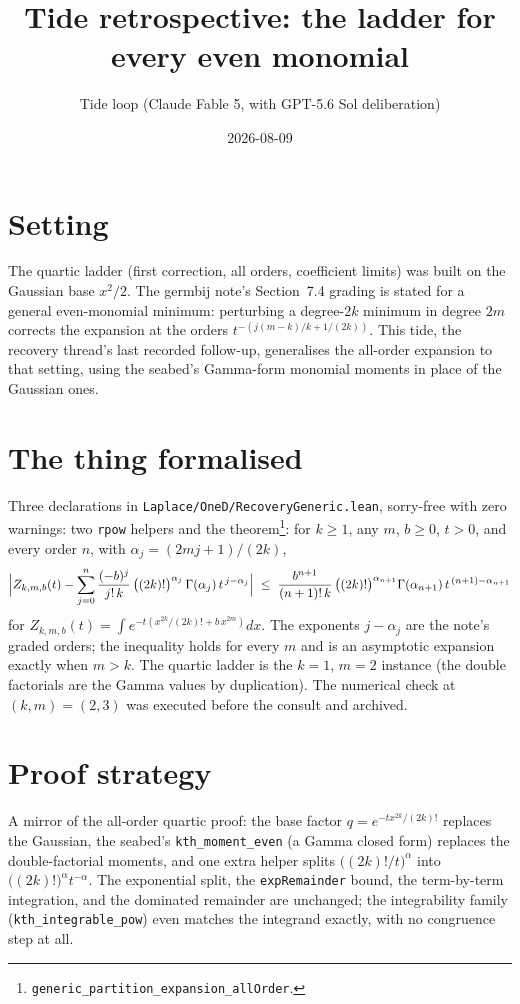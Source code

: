 \documentclass[11pt]{article}
\title{Tide retrospective: the ladder for every even monomial}
\author{Tide loop (Claude Fable 5, with GPT-5.6 Sol deliberation)}
\date{2026-08-09}
\begin{document}
\maketitle

\section{Setting}

The quartic ladder (first correction, all orders, coefficient limits)
was built on the Gaussian base $x^2/2$. The germbij note's Section~7.4
grading is stated for a general even-monomial minimum: perturbing a
degree-$2k$ minimum in degree $2m$ corrects the expansion at the orders
$t^{-(j(m-k)/k + 1/(2k))}$. This tide, the recovery thread's
last recorded follow-up, generalises the all-order expansion to that
setting, using the seabed's Gamma-form monomial moments in place of the
Gaussian ones.

\section{The thing formalised}

Three declarations in \texttt{Laplace/OneD/RecoveryGeneric.lean},
sorry-free with zero warnings: two \texttt{rpow} helpers and the
theorem\footnote{\texttt{generic\_partition\_expansion\_allOrder}.}: for
$k \geq 1$, any $m$, $b \geq 0$, $t > 0$, and every order $n$, with
$\alpha_j = (2mj+1)/(2k)$,
\[
\Bigl| Z_{k,m,b}(t) - \sum_{j=0}^{n}
\frac{(-b)^j}{j!\,k}\,\bigl((2k)!\bigr)^{\alpha_j}\,
\Gamma(\alpha_j)\, t^{\,j - \alpha_j} \Bigr|
\;\leq\;
\frac{b^{n+1}}{(n+1)!\,k}\,\bigl((2k)!\bigr)^{\alpha_{n+1}}
\Gamma(\alpha_{n+1})\, t^{\,(n+1) - \alpha_{n+1}}
\]
for $Z_{k,m,b}(t) = \int e^{-t(x^{2k}/(2k)! + b\,x^{2m})}dx$. The
exponents $j - \alpha_j$ are the note's graded orders; the inequality
holds for every $m$ and is an asymptotic expansion exactly when
$m > k$. The quartic ladder is the $k=1$, $m=2$ instance (the double
factorials are the Gamma values by duplication). The numerical check at
$(k, m) = (2, 3)$ was executed before the consult and archived.

\section{Proof strategy}

A mirror of the all-order quartic proof: the base factor
$q = e^{-t x^{2k}/(2k)!}$ replaces the Gaussian, the seabed's
\texttt{kth\_moment\_even} (a Gamma closed form) replaces the
double-factorial moments, and one extra helper splits
$\bigl((2k)!/t\bigr)^{\alpha}$ into $\bigl((2k)!\bigr)^{\alpha}
t^{-\alpha}$. The exponential split, the \texttt{expRemainder} bound,
the term-by-term integration, and the dominated remainder are unchanged;
the integrability family (\texttt{kth\_integrable\_pow}) even matches
the integrand exactly, with no congruence step at all.
\end{document}
